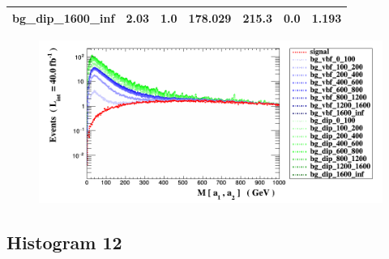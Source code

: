 \documentclass[a4paper, 10pt]{article}
\begin{document}
\begin{table}[H]
\begin{center}
\begin{tabular}{|m{23.0mm}|m{23.0mm}|m{18.0mm}|m{19.0mm}|m{19.0mm}|m{19.0mm}|m{19.0mm}|}
      \hline
      {\cellcolor{white}         bg\_dip\_1600\_inf}& {\cellcolor{white}         2.03}& {\cellcolor{white}         1.0}& {\cellcolor{white}         178.029}& {\cellcolor{white}         215.3}& {\cellcolor{green}         0.0}& {\cellcolor{green}         1.193}\\
\hline
    \end{tabular}
  \end{center}
\end{table}

\begin{figure}[H]
  \begin{center}
    \includegraphics[scale=0.45]{selection_10.png}\\
\caption{   }
  \end{center}
\end{figure}
      \newpage
\subsection{ Histogram 12}
\end{document}
